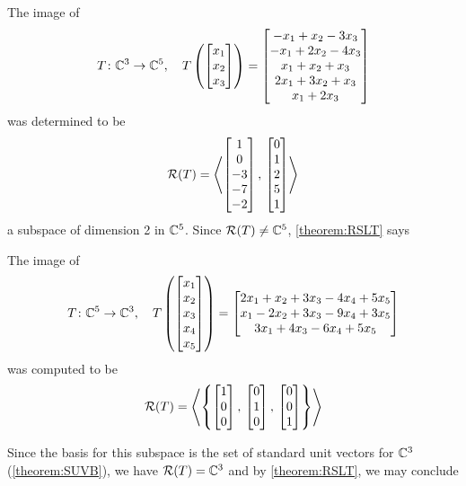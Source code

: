 \documentclass{ximera}
\begin{document}
\begin{example}

The image of
\[
T\colon \mathbb{C}^{3}\rightarrow\mathbb{C}^{5},\quad
T\left(\begin{bmatrix}x_1\\x_2\\x_3\end{bmatrix}\right)=
\begin{bmatrix}-x_1 + x_2 - 3 x_3\\
-x_1 + 2 x_2 - 4 x_3\\
x_1 + x_2 + x_3\\
2 x_1 + 3 x_2 + x_3\\
x_1 + 2 x_3
\end{bmatrix}
\]
 was determined to be
\[
\mathcal{R}\!\left(T\right)=\left\langle\begin{bmatrix}1\\0\\-3\\-7\\-2\end{bmatrix},\,\begin{bmatrix}0\\1\\2\\5\\1\end{bmatrix}\right\rangle
\]
a subspace of dimension 2 in $\mathbb{C}^{5}$.  Since $\mathcal{R}\!\left(T\right)\neq\mathbb{C}^{5}$, \ref{theorem:RSLT} says 
\begin{multipleChoice}
\end{multipleChoice}
\end{example}

\begin{example}

The image of 
\[
T\colon \mathbb{C}^{5}\rightarrow\mathbb{C}^{3},\quad
T\left(\begin{bmatrix}x_1\\x_2\\x_3\\x_4\\x_5\end{bmatrix}\right)=
\begin{bmatrix}2 x_1 + x_2 + 3 x_3 - 4 x_4 + 5 x_5\\
x_1 - 2 x_2 + 3 x_3 - 9 x_4 + 3 x_5\\
3 x_1 + 4 x_3 - 6 x_4 + 5 x_5\end{bmatrix}
\]
 was computed to be
\[
\mathcal{R}\!\left(T\right)=\left\langle\left\{
\begin{bmatrix}1\\0\\0\end{bmatrix},\,\begin{bmatrix}0\\1\\0\end{bmatrix},\,\begin{bmatrix}0\\0\\1\end{bmatrix}
\right\}\right\rangle\]

Since the basis for this subspace is the set of standard unit vectors for $\mathbb{C}^{3}$ (\ref{theorem:SUVB}), we have $\mathcal{R}\!\left(T\right)=\mathbb{C}^{3}$ and by \ref{theorem:RSLT}, we may conclude
\begin{multipleChoice}
\end{multipleChoice}

\end{example}
\end{document}
